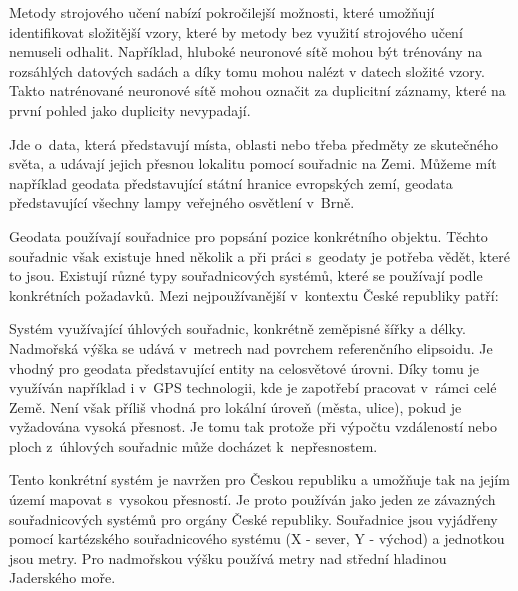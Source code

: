 Metody strojového učení nabízí pokročilejší možnosti, které umožňují identifikovat složitější vzory, které by metody bez využití strojového učení nemuseli odhalit. Například, hluboké neuronové sítě mohou být trénovány na rozsáhlých datových sadách a díky tomu mohou nalézt v datech složité vzory. Takto natrénované neuronové sítě mohou označit za duplicitní záznamy, které na první pohled jako duplicity nevypadají. \cite{pasek_mqdd_2022}

Jde o~data, která představují místa, oblasti nebo třeba předměty ze skutečného světa, a udávají jejich přesnou lokalitu pomocí souřadnic na Zemi. Můžeme mít například geodata představující státní hranice evropských zemí, geodata představující všechny lampy veřejného osvětlení v~Brně.


Geodata používají souřadnice pro popsání pozice konkrétního objektu. Těchto souřadnic však existuje hned několik a při práci s~geodaty je potřeba vědět, které to jsou. Existují různé typy souřadnicových systémů, které se používají podle konkrétních požadavků. Mezi nejpoužívanější v~kontextu České republiky patří:



Systém využívající úhlových souřadnic, konkrétně zeměpisné šířky a délky. Nadmořská výška se udává v~metrech nad povrchem referenčního elipsoidu.
Je vhodný pro geodata představující entity na celosvětové úrovni. Díky tomu je využíván například i v~GPS technologii, kde je zapotřebí pracovat v~rámci celé Země.
Není však příliš vhodná pro lokální úroveň (města, ulice), pokud je vyžadována vysoká přesnost. Je tomu tak protože při výpočtu vzdáleností nebo ploch z~úhlových souřadnic může docházet k~nepřesnostem.



Tento konkrétní systém je navržen pro Českou republiku a umožňuje tak na jejím území mapovat s~vysokou přesností. Je proto používán jako jeden ze závazných souřadnicových systémů pro orgány České republiky.
Souřadnice jsou vyjádřeny pomocí kartézského souřadnicového systému (X - sever, Y - východ) a jednotkou jsou metry. Pro nadmořskou výšku používá metry nad střední hladinou Jaderského moře.

